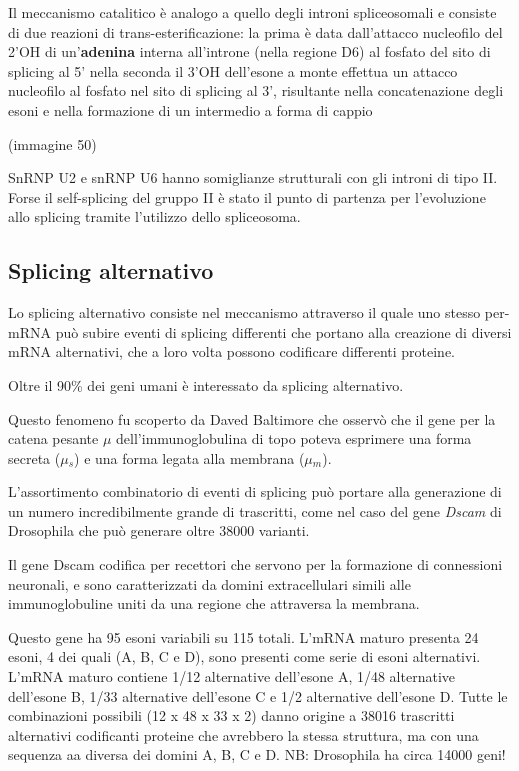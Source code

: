 \documentclass[11pt]{book}
\begin{document}
Il meccanismo catalitico è analogo a quello degli introni spliceosomali
e consiste di due reazioni di trans-esterificazione: la prima è data
dall'attacco nucleofilo del 2'OH di un'\textbf{adenina} interna
all'introne (nella regione D6) al fosfato del sito di splicing al 5'
nella seconda il 3'OH dell'esone a monte effettua un attacco nucleofilo
al fosfato nel sito di splicing al 3', risultante nella concatenazione
degli esoni e nella formazione di un intermedio a forma di cappio

(immagine 50)

SnRNP U2 e snRNP U6 hanno somiglianze strutturali con gli introni di
tipo II. Forse il self-splicing del gruppo II è stato il punto di
partenza per l'evoluzione allo splicing tramite l'utilizzo dello
spliceosoma.

\subsection{Splicing alternativo}\label{splicing-alternativo}

Lo splicing alternativo consiste nel meccanismo attraverso il quale uno
stesso per-mRNA può subire eventi di splicing differenti che portano
alla creazione di diversi mRNA alternativi, che a loro volta possono
codificare differenti proteine.

Oltre il 90\% dei geni umani è interessato da splicing alternativo.

Questo fenomeno fu scoperto da Daved Baltimore che osservò che il gene
per la catena pesante \(\mu\) dell'immunoglobulina di topo poteva
esprimere una forma secreta (\(\mu\)\(_s\)) e una forma legata alla
membrana (\(\mu\)\(_m\)).

L'assortimento combinatorio di eventi di splicing può portare alla
generazione di un numero incredibilmente grande di trascritti, come nel
caso del gene \emph{Dscam} di Drosophila che può generare oltre 38000
varianti.

Il gene Dscam codifica per recettori che servono per la formazione di
connessioni neuronali, e sono caratterizzati da domini extracellulari
simili alle immunoglobuline uniti da una regione che attraversa la
membrana.

Questo gene ha 95 esoni variabili su 115 totali. L'mRNA maturo presenta
24 esoni, 4 dei quali (A, B, C e D), sono presenti come serie di esoni
alternativi. L'mRNA maturo contiene 1/12 alternative dell'esone A, 1/48
alternative dell'esone B, 1/33 alternative dell'esone C e 1/2
alternative dell'esone D. Tutte le combinazioni possibili (12 x 48 x 33
x 2) danno origine a 38016 trascritti alternativi codificanti proteine
che avrebbero la stessa struttura, ma con una sequenza aa diversa dei
domini A, B, C e D. NB: Drosophila ha circa 14000 geni!
\end{document}
